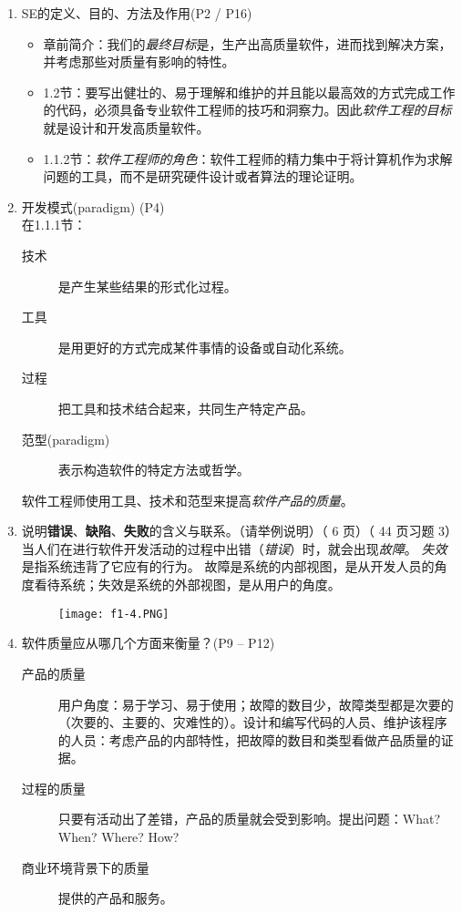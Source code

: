 \documentclass[14pt, letterpaper, UTF8, fontset=windowsnew, heading=true]{article}
\begin{document}
\begin{enumerate}
	\item SE的定义、目的、方法及作用(P2 / P16)
	\begin{itemize}
		\item 章前简介：我们的\emph{最终目标}是，生产出高质量软件，进而找到解决方案，并考虑那些对质量有影响的特性。
		\item 1.2节：要写出健壮的、易于理解和维护的并且能以最高效的方式完成工作的代码，必须具备专业软件工程师的技巧和洞察力。因此\emph{软件工程的目标}就是设计和开发高质量软件。
		\item 1.1.2节：\emph{软件工程师的角色}：软件工程师的精力集中于将计算机作为求解问题的工具，而不是研究硬件设计或者算法的理论证明。
	\end{itemize}
	
	\item 开发模式(paradigm) (P4) \\
	在1.1.1节：
	\begin{description}
		\item[技术] 是产生某些结果的形式化过程。
		\item[工具] 是用更好的方式完成某件事情的设备或自动化系统。
		\item[过程] 把工具和技术结合起来，共同生产特定产品。
		\item[范型(paradigm)] 表示构造软件的特定方法或哲学。
	\end{description}
	软件工程师使用工具、技术和范型来提高\emph{软件产品的质量}。
	
	\item
	说明\textbf{错误}、\textbf{缺陷}、\textbf{失败}的含义与联系。（请举例说明）（ 6 页）（ 44 页习题 3） \\
	当人们在进行软件开发活动的过程中出错（\emph{错误}）时，就会出现\emph{故障}。
	\emph{失效}是指系统违背了它应有的行为。
	故障是系统的内部视图，是从开发人员的角度看待系统；失效是系统的外部视图，是从用户的角度。
	\begin{figure}[h]
		\centering
		\texttt{[image: f1-4.PNG]}
	\end{figure}
	
	\item 软件质量应从哪几个方面来衡量？(P9 -- P12)
	\begin{description}
		\item[产品的质量] 用户角度：易于学习、易于使用；故障的数目少，故障类型都是次要的（次要的、主要的、灾难性的）。设计和编写代码的人员、维护该程序的人员：考虑产品的内部特性，把故障的数目和类型看做产品质量的证据。
		\item[过程的质量] 只要有活动出了差错，产品的质量就会受到影响。提出问题：What? When? Where? How?
		\item[商业环境背景下的质量] 提供的产品和服务。
	\end{description}


\end{enumerate}
\end{document}
